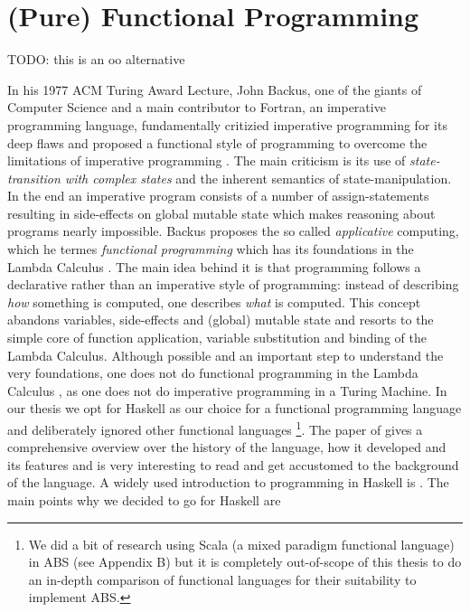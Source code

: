 \section{(Pure) Functional Programming}
TODO: this is an oo alternative

In his 1977 ACM Turing Award Lecture, John Backus, one of the giants of Computer Science and a main contributor to Fortran, an imperative programming language, fundamentally critizied imperative programming for its deep flaws and proposed a functional style of programming to overcome the limitations of imperative programming \cite{backus_can_1978}. The main criticism is its use of \textit{state-transition with complex states} and the inherent semantics of state-manipulation. In the end an imperative program consists of a number of assign-statements resulting in side-effects on global mutable state which makes reasoning about programs nearly impossible. Backus proposes the so called \textit{applicative} computing, which he termes \textit{functional programming} which has its foundations in the Lambda Calculus \cite{church_calculi_1941}. The main idea behind it is that programming follows a declarative rather than an imperative style of programming: instead of describing \textit{how} something is computed, one describes \textit{what} is computed. This concept abandons variables, side-effects and (global) mutable state and resorts to the simple core of function application, variable substitution and binding of the Lambda Calculus. Although possible and an important step to understand the very foundations, one does not do functional programming in the Lambda Calculus \cite{michaelson_introduction_2011}, as one does not do imperative programming in a Turing Machine. 
In our thesis we opt for Haskell as our choice for a functional programming language and deliberately ignored other functional languages \footnote{We did a bit of research using Scala (a mixed paradigm functional language) in ABS (see Appendix B) but it is completely out-of-scope of this thesis to do an in-depth comparison of functional languages for their suitability to implement ABS.}. The paper of \cite{hudak_history_2007} gives a comprehensive overview over the history of the language, how it developed and its features and is very interesting to read and get accustomed to the background of the language. A widely used introduction to programming in Haskell is \cite{hutton_programming_2016}. The main points why we decided to go for Haskell are

